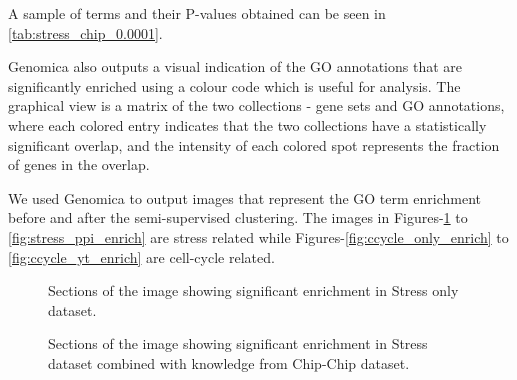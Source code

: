 
A sample of terms and their P-values obtained can be seen in \ref{tab:stress_chip_0.0001}. 

Genomica also outputs a visual indication of the GO annotations that are significantly enriched using a colour code which is useful for analysis. The graphical view is a 
matrix of the two collections - gene sets and GO annotations, where each colored entry indicates that the two collections have a statistically significant 
overlap, and the intensity of each colored spot represents the fraction of genes in the overlap. 

We used Genomica to output images that represent the GO term enrichment before and after the semi-supervised clustering. 
The images in Figures-\ref{fig:stress_only_enrich} to \ref{fig:stress_ppi_enrich} are stress related while Figures-\ref{fig:ccycle_only_enrich} to \ref{fig:ccycle_yt_enrich} are cell-cycle
 related.

\begin{figure}[ph]
\centering
{}
\label{fig:stress_only_enrich}
\caption{Sections of the image showing significant enrichment in Stress only dataset. }
\end{figure}

\begin{figure}[p]
\centering
{}
\label{fig:stress_chip_enrich}
\caption{Sections of the image showing significant enrichment in Stress dataset combined with knowledge from Chip-Chip dataset. }
\end{figure}

